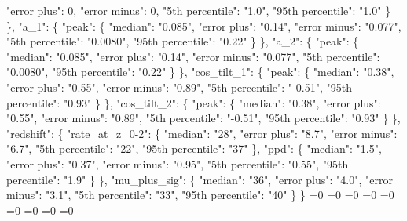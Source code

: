 {{          "error plus": 0, %
          "error minus": 0, %
          "5th percentile": "1.0", %
          "95th percentile": "1.0"%
        \}%
      \}, %
      "a\_1": \{%
        "peak": \{%
          "median": "0.085", %
          "error plus": "0.14", %
          "error minus": "0.077", %
          "5th percentile": "0.0080", %
          "95th percentile": "0.22"%
        \}%
      \}, %
      "a\_2": \{%
        "peak": \{%
          "median": "0.085", %
          "error plus": "0.14", %
          "error minus": "0.077", %
          "5th percentile": "0.0080", %
          "95th percentile": "0.22"%
        \}%
      \}, %
      "cos\_tilt\_1": \{%
        "peak": \{%
          "median": "0.38", %
          "error plus": "0.55", %
          "error minus": "0.89", %
          "5th percentile": "{-}0.51", %
          "95th percentile": "0.93"%
        \}%
      \}, %
      "cos\_tilt\_2": \{%
        "peak": \{%
          "median": "0.38", %
          "error plus": "0.55", %
          "error minus": "0.89", %
          "5th percentile": "{-}0.51", %
          "95th percentile": "0.93"%
        \}%
      \}, %
      "redshift": \{%
        "rate\_at\_z\_0{-}2": \{%
          "median": "28", %
          "error plus": "8.7", %
          "error minus": "6.7", %
          "5th percentile": "22", %
          "95th percentile": "37"%
        \}, %
        "ppd": \{%
          "median": "1.5", %
          "error plus": "0.37", %
          "error minus": "0.95", %
          "5th percentile": "0.55", %
          "95th percentile": "1.9"%
        \}%
      \}, %
      "mu\_plus\_sig": \{%
        "median": "36", %
        "error plus": "4.0", %
        "error minus": "3.1", %
        "5th percentile": "33", %
        "95th percentile": "40"%
      \}%
    \}}%
  \else%
    \ifnum{}=0%
      \let\defaultbbh@out\defaultbbh@I%
    \else%
      \ifnum{}=0%
      \let\defaultbbh@out\defaultbbh@II%
    \else%
      \ifnum{}=0%
      \let\defaultbbh@out\defaultbbh@III%
    \else%
      \ifnum{}=0%
      \let\defaultbbh@out\defaultbbh@IV%
    \else%
      \ifnum{}=0%
      \let\defaultbbh@out\defaultbbh@V%
    \else%
      \ifnum{}=0%
      \let\defaultbbh@out\defaultbbh@VI%
    \else%
      \ifnum{}=0%
      \let\defaultbbh@out\defaultbbh@VII%
    \else%
      \ifnum{}=0%
      \let\defaultbbh@out\defaultbbh@VIII%
    \else%
      \ifnum{}=0%
      \let\defaultbbh@out\defaultbbh@IX%
    \else%
}
